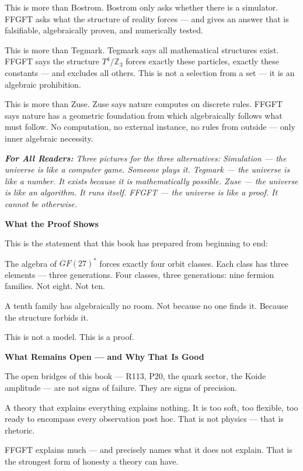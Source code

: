 \documentclass[11pt,oneside]{book}
\newenvironment{laierspur}{%
  \par\vspace{4pt}%
  \noindent\small\itshape\color{blue!60!black}%
  \textbf{For All Readers:}\enspace\ignorespaces}{%
  \par\vspace{4pt}\normalsize\normalfont\normalcolor}
\begin{document}
This is more than Bostrom. Bostrom only asks whether there is a simulator.
FFGFT asks what the structure of reality forces — and gives an answer that
is falsifiable, algebraically proven, and numerically tested.

This is more than Tegmark. Tegmark says all mathematical structures exist.
FFGFT says the structure $T^4/\mathbb{Z}_3$ forces exactly these particles, exactly
these constants — and excludes all others. This is not a selection from a
set — it is an algebraic prohibition.

This is more than Zuse. Zuse says nature computes on discrete rules. FFGFT
says nature has a geometric foundation from which algebraically follows what
must follow. No computation, no external instance, no rules from outside —
only inner algebraic necessity.

\begin{laierspur}
Three pictures for the three alternatives:
Simulation — the universe is like a computer game. Someone plays it.
Tegmark — the universe is like a number. It exists because it is
mathematically possible.
Zuse — the universe is like an algorithm. It runs itself.
FFGFT — the universe is like a proof. It cannot be otherwise.
\end{laierspur}

\textbf{What the Proof Shows}

This is the statement that this book has prepared from beginning to end:

The algebra of $GF(27)^*$ forces exactly four orbit classes. Each class has
three elements — three generations. Four classes, three generations: nine
fermion families. Not eight. Not ten.

A tenth family has algebraically no room. Not because no one finds it.
Because the structure forbids it.

This is not a model. This is a proof.

\textbf{What Remains Open — and Why That Is Good}

The open bridges of this book — R113, P20, the quark sector, the Koide
amplitude — are not signs of failure. They are signs of precision.

A theory that explains everything explains nothing. It is too soft, too
flexible, too ready to encompass every observation post hoc. That is not
physics — that is rhetoric.

FFGFT explains much — and precisely names what it does not explain. That is
the strongest form of honesty a theory can have.
\end{document}
